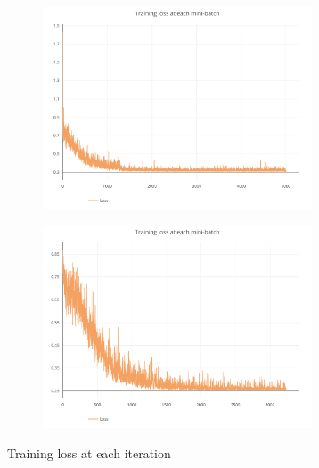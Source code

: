 \documentclass[journal]{IEEEtran}
\begin{document}
\begin{figure}[h]
	\centering

	\begin{subfigure}{0.49\textwidth}
		\centering
		\includegraphics[height = 6cm]{Images/minibatchtrainloss.pdf}
	\end{subfigure}
	\hspace{1mm}
	\begin{subfigure}{0.49\textwidth}
		\centering
		\includegraphics[height = 6cm]{Images/minibatchtrainloss1.pdf}
	\end{subfigure}
	
	\caption{Training loss at each iteration}
\end{figure}
\end{document}
